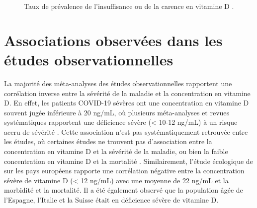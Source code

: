 \documentclass[
  a4paper,
  DIV=11,
  numbers=noendperiod,
  listof=totoc]{scrreprt}
\begin{document}
\begin{figure}


\caption[Taux de prévalence de l'insuffisance ou de la carence en
vitamine D]{\label{fig-vd-covid-deficiency}Taux de prévalence de
l'insuffisance ou de la carence en vitamine D \autocite{Campi.2021}.}

\end{figure}%

\section{Associations observées dans les études
observationnelles}\label{associations-observuxe9es-dans-les-uxe9tudes-observationnelles}

La majorité des méta-analyses des études observationnelles rapportent
une corrélation inverse entre la sévérité de la maladie et la
concentration en vitamine D. En effet, les patients COVID-19 sévères ont
une concentration en vitamine D souvent jugée inférieure à 20 ng/mL, où
plusieurs méta-analyses et revues systématiques rapportent une
déficience sévère (\textless{} 10-12 ng/mL) à un risque accru de
sévérité \autocite{Contreras-Bolívar.2023, Borsche.2021,
Crafa.2021, DEcclesiis.2022, Pal.2022, Hariyanto.2022, Ghelani.2021}.
Cette association n'est pas systématiquement retrouvée entre les études,
où certaines études ne trouvent pas d'association entre la concentration
en vitamine D et la sévérité de la maladie, ou bien la faible
concentration en vitamine D et la mortalité \autocite{Kaya.2021}.
Similairement, l'étude écologique de \textcite{Ilie.2020} sur les pays
européens rapporte une corrélation négative entre la concentration
sévère de vitamine D (\textless{} 12 ng/mL) avec une moyenne de 22 ng/mL
et la morbidité et la mortalité. Il a été également observé que la
population âgée de l'Espagne, l'Italie et la Suisse était en déficience
sévère de vitamine D.
\end{document}
